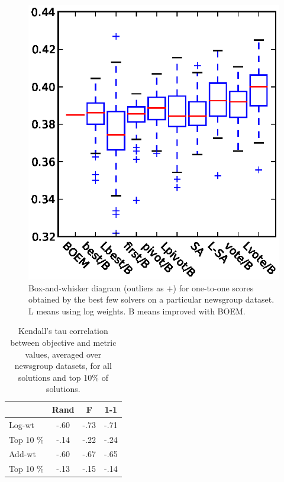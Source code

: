 \documentclass[11pt]{article}
\newcommand{\alg}[1]{\textsc{#1}}
\begin{document}
\begin{figure}[bt!]
\includegraphics{box-tiny-3.eps}
\caption{Box-and-whisker diagram (outliers as $+$) for one-to-one
  scores obtained by the best few solvers on a particular newsgroup
  dataset. L means using log weights. B means improved with \alg{BOEM}.}
\label{box}
\end{figure}

\begin{table}
\begin{tabular}{l|ccc}
& Rand & F & 1-1\\
\hline
Log-wt & -.60 & -.73 & -.71\\
Top 10 \% & -.14 & -.22 & -.24\\
\hline
Add-wt & -.60 & -.67 & -.65\\
Top 10 \% & -.13 & -.15 & -.14
\end{tabular}
\caption{Kendall's tau correlation between objective and metric
  values, averaged over newsgroup datasets, for all solutions and top
  10\% of solutions.}
\label{correlations}
\end{table}

\end{document}
